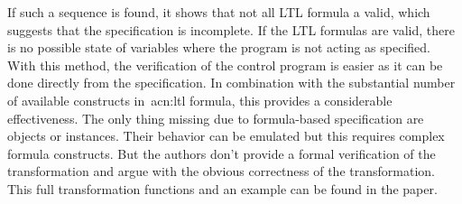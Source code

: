 If such a sequence is found, it shows that not all LTL formula a valid, which suggests that the specification is incomplete.
If the LTL formulas are valid, there is no possible state of variables where the program is not acting as specified.
With this method, the verification of the control program is easier as it can be done directly from the specification.
In combination with the substantial number of available constructs in~\acrshort{acn:ltl} formula, this provides a considerable effectiveness.
The only thing missing due to formula-based specification are objects or instances.
Their behavior can be emulated but this requires complex formula constructs.
But the authors don't provide a formal verification of the transformation and argue with the obvious correctness of the transformation.
This full transformation functions and an example can be found in the paper.

